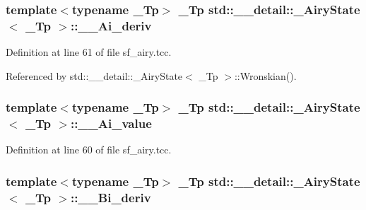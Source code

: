 \subsubsection[{\texorpdfstring{\+\_\+\+\_\+\+Ai\+\_\+deriv}{__Ai_deriv}}]{\setlength{\rightskip}{0pt plus 5cm}template$<$typename \+\_\+\+Tp$>$ \+\_\+\+Tp {\bf std\+::\+\_\+\+\_\+detail\+::\+\_\+\+Airy\+State}$<$ \+\_\+\+Tp $>$\+::\+\_\+\+\_\+\+Ai\+\_\+deriv}\hypertarget{structstd_1_1____detail_1_1__AiryState_a3d918b7b8cb09fd4bb57c10a5853c36f}{}\label{structstd_1_1____detail_1_1__AiryState_a3d918b7b8cb09fd4bb57c10a5853c36f}


Definition at line 61 of file sf\+\_\+airy.\+tcc.



Referenced by std\+::\+\_\+\+\_\+detail\+::\+\_\+\+Airy\+State$<$ \+\_\+\+Tp $>$\+::\+Wronskian().

\subsubsection[{\texorpdfstring{\+\_\+\+\_\+\+Ai\+\_\+value}{__Ai_value}}]{\setlength{\rightskip}{0pt plus 5cm}template$<$typename \+\_\+\+Tp$>$ \+\_\+\+Tp {\bf std\+::\+\_\+\+\_\+detail\+::\+\_\+\+Airy\+State}$<$ \+\_\+\+Tp $>$\+::\+\_\+\+\_\+\+Ai\+\_\+value}\hypertarget{structstd_1_1____detail_1_1__AiryState_ad4a37f92020588e84a18fc1e93b02af6}{}\label{structstd_1_1____detail_1_1__AiryState_ad4a37f92020588e84a18fc1e93b02af6}


Definition at line 60 of file sf\+\_\+airy.\+tcc.

\subsubsection[{\texorpdfstring{\+\_\+\+\_\+\+Bi\+\_\+deriv}{__Bi_deriv}}]{\setlength{\rightskip}{0pt plus 5cm}template$<$typename \+\_\+\+Tp$>$ \+\_\+\+Tp {\bf std\+::\+\_\+\+\_\+detail\+::\+\_\+\+Airy\+State}$<$ \+\_\+\+Tp $>$\+::\+\_\+\+\_\+\+Bi\+\_\+deriv}\hypertarget{structstd_1_1____detail_1_1__AiryState_a0f80df510bae0d9a812fae2a20ac3c20}{}\label{structstd_1_1____detail_1_1__AiryState_a0f80df510bae0d9a812fae2a20ac3c20}


